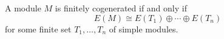 A module $M$ is finitely cogenerated if and only if
$$E(M) \cong E(T_1) \oplus \cdots \oplus E(T_n)$$
for some finite set $T_1, \ldots, T_n$ of simple modules.
